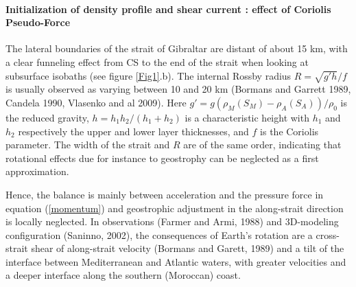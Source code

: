  
\paragraph{Initialization of density profile and shear current : effect of Coriolis Pseudo-Force}
\label{Coriolis}

The lateral boundaries of the strait of Gibraltar are distant of about 15 km, with a clear funneling effect from CS to the end of the strait when looking at subsurface isobaths (see figure \ref{Fig1}.b). The internal Rossby radius $R={\sqrt{g'h}}/{f}$ is usually observed as varying between 10 and 20 km (Bormans and Garrett 1989, Candela 1990, Vlasenko and al 2009). Here $g'= g (\rho_M(S_M) - \rho_A(S_A))/\rho_0$ is the reduced gravity, $h=h_1 h_2/(h_1+h_2)$ is a characteristic height with $h_1$ and $h_2$ respectively the upper and lower layer thicknesses, and $f$ is the Coriolis parameter. The width of the strait and $R$ are of the same order, indicating that rotational effects due for instance to geostrophy can be neglected as a first approximation. 

Hence, the balance is mainly between acceleration and the pressure force in equation (\ref{momentum}) and geostrophic adjustment in the along-strait direction is locally neglected. In observations (Farmer and Armi, 1988) and 3D-modeling configuration (Saninno, 2002), the consequences of Earth's rotation are a cross-strait shear of along-strait velocity (Bormans and Garett, 1989) and a tilt of the interface between Mediterranean and Atlantic waters, with greater velocities and a deeper interface along the southern (Moroccan) coast.

